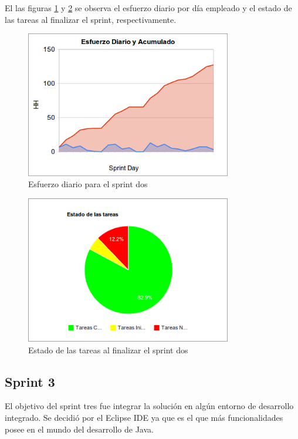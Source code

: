 \documentclass[12pt,a4paper]{article}
\begin{document}
El las figuras \ref{sprint2-esfuerzo} y \ref{sprint2-tareas-fin} se observa el esfuerzo diario por día empleado
y el estado de las tareas al finalizar el sprint, respectivamente.

	\begin{figure}[!ht]
		\begin{center}
			\includegraphics[width=9cm]{sprint2-esfuerzo-diario.png}
			\caption{\label{sprint2-esfuerzo} Esfuerzo diario para el sprint dos }
		\end{center}
	\end{figure}

	\begin{figure}[!ht]
		\begin{center}
			\includegraphics[width=9cm]{sprint2-tareas.png}
			\caption{\label{sprint2-tareas-fin} Estado de las tareas al finalizar el sprint dos }
		\end{center}
	\end{figure}

\subsection{Sprint 3}

El objetivo del sprint tres fue integrar la solución en algún entorno de desarrollo integrado. Se decidió por el Eclipse IDE
ya que es el que más funcionalidades posee en el mundo del desarrollo de Java.
\end{document}
